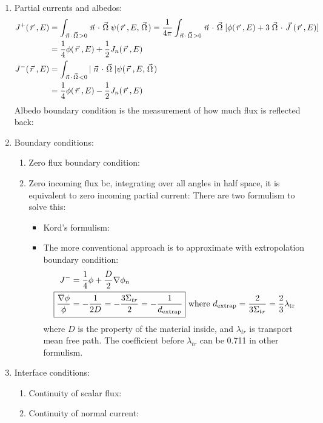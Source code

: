 \documentclass{school-22.211-notes}
\begin{document}
\begin{enumerate}
\item Partial currents and albedos:
  \begin{align}
    J^+(\left.\vec{r}\right., E) &= \int_{\left.\vec{n}\right. \cdot \left.\vec{\Omega}\right. > 0} \left.\vec{n}\right. \cdot \left.\vec{\Omega}\right. \psi(\left.\vec{r}\right., E, \left.\vec{\Omega}\right.) = \frac{1}{4\pi} \int_{\left.\vec{n}\right. \cdot \left.\vec{\Omega}\right. > 0} \left.\vec{n}\right. \cdot \left.\vec{\Omega}\right. [\phi(\left.\vec{r}\right., E) + 3 \left.\vec{\Omega}\right. \cdot \left.\vec{J}\right.(\left.\vec{r}\right., E) ] \\
    &= \frac{1}{4} \phi(\left.\vec{r}\right., E) + \frac{1}{2} J_n (\left.\vec{r}\right., E) \\
    J^-(\left.\vec{r}\right., E) &= \int_{\left.\vec{n}\right. \cdot \left.\vec{\Omega}\right. < 0} |\left.\vec{n}\right. \cdot \left.\vec{\Omega}\right.| \psi(\left.\vec{r}\right., E, \left.\vec{\Omega}\right.)  \\
    &= \frac{1}{4} \phi(\left.\vec{r}\right., E) - \frac{1}{2} J_n (\left.\vec{r}\right., E) 
  \end{align}
  Albedo boundary condition is the measurement of how much flux is reflected back: 
  
\item Boundary conditions:
  \begin{enumerate}
  \item Zero flux boundary condition:

  \item Zero incoming flux bc, integrating over all angles in half space, it is equivalent to zero incoming partial current:
    There are two formulism to solve this:
    \begin{itemize}
    \item Kord's formulism: 
    \item The more conventional approach is to approximate with extropolation boundary condition: 
      \begin{align}
        J^- &= \frac{1}{4} \phi + \frac{D}{2} \gradient \phi_n \\
        \Aboxed{ \frac{\gradient \phi}{\phi} &= - \frac{1}{2D} = - \frac{3\Sigma_{tr}}{2} = - \frac{1}{d_{\mathrm{extrap}}}} 
        \mbox{   where } d_{\mathrm{extrap}} = \frac{2}{3 \Sigma_{tr}}  = \frac{2}{3} \lambda_{\mathrm{tr}}
      \end{align}
      where $D$ is the property of the material inside, and $\lambda_{tr}$ is transport mean free path. The coefficient before $\lambda_{tr}$ can be 0.711 in other formulism. 
    \end{itemize}
  \end{enumerate}

\item Interface conditions: 
  \begin{enumerate}
    \item Continuity of scalar flux: 
    \item Continuity of normal current:
  \end{enumerate}
\end{enumerate}
\end{document}
